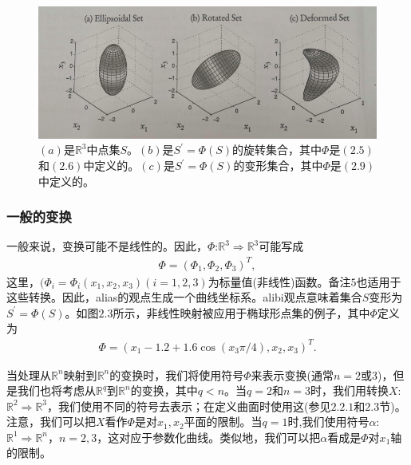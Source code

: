 \begin{figure}[H]
\centering
\includegraphics[scale=0.5]{./figures/23.png}
\caption{$(a)$是$\mathbb{R}^3$中点集$S$。$(b)$是$S^{'}=\Phi (S)$的旋转集合，其中$\Phi$是$(2.5)$和$(2.6)$中定义的。$(c)$是$S^{'}=\Phi (S)$的变形集合，其中$\Phi$是$(2.9)$中定义的。}
\end{figure}

\subsubsection{一般的变换}
一般来说，变换可能不是线性的。因此，$\Phi$:$\mathbb{R}^3 \Rightarrow \mathbb{R}^3$可能写成
\begin{gather}
\Phi=(\Phi _1,\Phi _2,\Phi _3)^T,
\end{gather}
这里，$(\Phi_i= \Phi _i(x_1,x_2,x_3) (i = 1,2,3)$为标量值(非线性)函数。备注$5$也适用于这些转换。因此，alias的观点生成一个曲线坐标系。alibi观点意味着集合$S$变形为$S^{'}=\Phi (S)$。如图$2.3$所示，非线性映射被应用于椭球形点集的例子，其中$\Phi$定义为
\begin{gather}
\Phi=(x_1-1.2+1.6\cos (x_3 \pi /4),x_2,x_3)^T.
\end{gather}

当处理从$\mathbb{R}^n$映射到$\mathbb{R}^n$的变换时，我们将使用符号$\Phi$来表示变换(通常$n =2$或$3$)，但是我们也将考虑从$\mathbb{R}^q$到$\mathbb{R}^n$的变换，其中$q <n$。当$q = 2$和$n = 3$时，我们用转换$X$:$\mathbb{R}^2 \Rightarrow \mathbb{R}^3$，我们使用不同的符号去表示；在定义曲面时使用这(参见$2.2.1$和$2.3$节)。注意，我们可以把$X$看作$\Phi$是对$x_1,x_2$平面的限制。当$q = 1$时,我们使用符号$\alpha$:$\mathbb{R}^1 \Rightarrow \mathbb{R}^n$，$n=2,3$，这对应于参数化曲线。类似地，我们可以把$\alpha$看成是$\Phi$对$x_1$轴的限制。